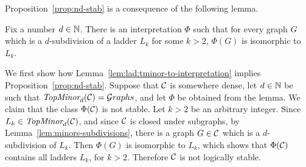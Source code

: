 	
	
Proposition~\ref{prop:nd-stab} is a consequence of the following lemma.
  \begin{lemma}\label{lem:lad:tminor-to-interpretation}
    Fix a number $d\in\mathbb{N}$.
    There is an interpretation $\Phi$ such that 
    for every graph $G$ which is a $d$-subdivision
    of a ladder $L_k$ for some $k>2$, $\Phi(G)$
    is isomorphic to $L_k$.
  \end{lemma}
We first show how Lemma~\ref{lem:lad:tminor-to-interpretation} implies Proposition~\ref{prop:nd-stab}.
      Suppose that ${\cal C}$ is somewhere dense, let $d\in\mathbb{N}$ be such that $\textit{TopMinor}_{d}({\cal C})={\mathcal G}\!\,raphs$, and let $\Phi$ be obtained from the lemma. We claim that the class $\Phi({\cal C})$ is not stable. Let $k>2$ be an arbitrary integer.
  Since $L_k\in\textit{TopMinor}_{d}({\cal C})$, and since ${\cal C}$ is closed under subgraphs, by Lemma~\ref{lem:minors-subdivisions},
  there is  a  graph $G\in {\cal C}$ which is a $d$-subdivision of $L_k$.
Then
$\Phi(G)$ is isomorphic to $L_k$, which shows that $\Phi({\cal C})$ contains all ladders $L_k$, for $k>2$. Therefore ${\cal C}$ is not logically stable.
  
